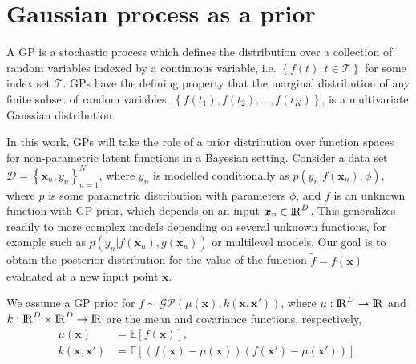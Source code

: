 \documentclass[onecolumn,a4paper,11pt]{article}
\begin{document}
\section{Gaussian process as a prior}\label{ch4_gp}

A GP is a stochastic process which defines the distribution over a collection of random variables indexed by a continuous variable, i.e. $\left\lbrace f(t): t \in \mathcal{T}\right\rbrace$ for some index set $\mathcal{T}$. GPs have the defining property that the marginal distribution of any finite subset of random variables, $\left\lbrace f(t_1), f(t_2), \hdots, f(t_K) \right\rbrace$, is a multivariate Gaussian distribution.

In this work, GPs will take the role of a prior distribution over function spaces for non-parametric latent functions in a Bayesian setting. 
Consider a data set $\mathcal{D} = \left\lbrace \bm{x}_n, y_n \right\rbrace_{n=1}^N$, where $y_n$ is modelled conditionally as $p(y_n|f(\bm{x}_n),\phi)$, where $p$ is some parametric distribution with parameters  $\phi$, and $f$ is an unknown function with GP prior, which depends on an input $\bm{x}_n\in {\rm I\!R}^D$. This generalizes readily to more complex models depending on several unknown functions, for example such as $p(y_n|f(\bm{x}_n),g(\bm{x}_n))$ or multilevel models. Our goal is to obtain the posterior distribution for the value of the function $\tilde{f}=f(\tilde{\bm{x}})$  evaluated at a new input point $\tilde{\bm{x}}$.

We assume a GP prior for $f \sim \mathcal{GP}(\mu(\bm{x}), k(\bm{x}, \bm{x}'))$, where $\mu: {\rm I\!R}^D \rightarrow {\rm I\!R}$ and $k: {\rm I\!R}^D \times {\rm I\!R}^D \rightarrow {\rm I\!R}$ are the mean and covariance functions, respectively,
%
\begin{align*}
 	\mu(\bm{x}) &= \mathbb{E}\!\left[f(\bm{x})\right],\\ 
 	k(\bm{x}, \bm{x}') &= \mathbb{E}\!\left[\left( f(\bm{x}) - \mu(\bm{x}) \right)\left( f(\bm{x}') - \mu(\bm{x}') \right)\right].
\end{align*} 
\end{document}
